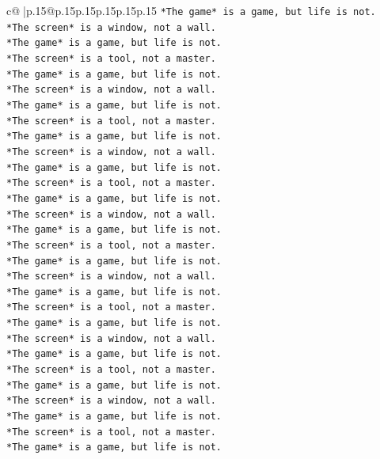 \documentclass{article}
\begin{document}
{\begin{supertabular}{c@{$\;$}|p{.15\linewidth}@{}p{.15\linewidth}p{.15\linewidth}p{.15\linewidth}p{.15\linewidth}p{.15\linewidth}}
{{{\texttt{*The game* is a game, but life is not.} \\
\texttt{*The screen* is a window, not a wall.} \\
\texttt{*The game* is a game, but life is not.} \\
\texttt{*The screen* is a tool, not a master.} \\
\texttt{*The game* is a game, but life is not.} \\
\texttt{*The screen* is a window, not a wall.} \\
\texttt{*The game* is a game, but life is not.} \\
\texttt{*The screen* is a tool, not a master.} \\
\texttt{*The game* is a game, but life is not.} \\
\texttt{*The screen* is a window, not a wall.} \\
\texttt{*The game* is a game, but life is not.} \\
\texttt{*The screen* is a tool, not a master.} \\
\texttt{*The game* is a game, but life is not.} \\
\texttt{*The screen* is a window, not a wall.} \\
\texttt{*The game* is a game, but life is not.} \\
\texttt{*The screen* is a tool, not a master.} \\
\texttt{*The game* is a game, but life is not.} \\
\texttt{*The screen* is a window, not a wall.} \\
\texttt{*The game* is a game, but life is not.} \\
\texttt{*The screen* is a tool, not a master.} \\
\texttt{*The game* is a game, but life is not.} \\
\texttt{*The screen* is a window, not a wall.} \\
\texttt{*The game* is a game, but life is not.} \\
\texttt{*The screen* is a tool, not a master.} \\
\texttt{*The game* is a game, but life is not.} \\
\texttt{*The screen* is a window, not a wall.} \\
\texttt{*The game* is a game, but life is not.} \\
\texttt{*The screen* is a tool, not a master.} \\
\texttt{*The game* is a game, but life is not.} \\
}}}
\end{supertabular}}
\end{document}
